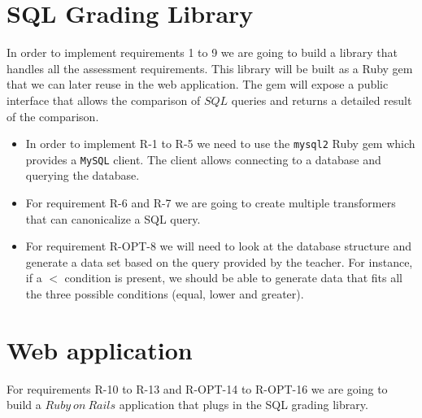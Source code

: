 \section{SQL Grading Library}
In order to implement requirements 1 to 9 we are going to build a library that
handles all the assessment requirements. This library will be built as a Ruby
gem that we can later reuse in the web application. The gem will expose a
public interface that allows the comparison of $SQL$ queries and returns a
detailed result of the comparison.

\begin{itemize}
  \item In order to implement R-1 to R-5 we need to use the \texttt{mysql2}
  Ruby gem which provides a \texttt{MySQL} client. The client allows connecting
  to a database and querying the database.
  \item For requirement R-6 and R-7 we are going to create multiple transformers
  that can canonicalize a SQL query.
  \item For requirement R-OPT-8 we will need to look at the database structure
  and generate a data set based on the query provided by the teacher. For instance,
  if a $<$ condition is present, we should be able to generate data that fits all the
  three possible conditions (equal, lower and greater).
\end{itemize}

\section{Web application}
For requirements R-10 to R-13 and R-OPT-14 to R-OPT-16 we are going to build
a $Ruby\ on\ Rails$ application that plugs in the SQL grading library.
